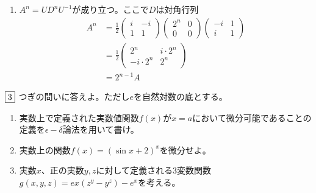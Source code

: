 \documentclass[dvipdfmx]{jsreport}
\begin{document}
\begin{souanswer}
\begin{enumerate}
\begin{equation*}
\end{equation*}
	これをみたすような$U$は$\frac{1}{\sqrt{2}}\begin{pmatrix}i& -i\\1& 1\end{pmatrix}$
	\item $A^n= UD^nU^{-1}$が成り立つ。ここで$D$は対角行列
\begin{align*}
	A^n
	&= \frac{1}{2}\begin{pmatrix}i& -i\\ 1& 1\end{pmatrix}\begin{pmatrix}2^n& 0\\ 0& 0\end{pmatrix}\begin{pmatrix}-i& 1\\ i& 1\end{pmatrix}\\
	&= \frac{1}{2}\begin{pmatrix}2^n& i\cdot 2^n\\ -i\cdot 2^n& 2^n\end{pmatrix}\\
	&= 2^{n- 1}A
\end{align*}
\end{enumerate}
\end{souanswer}

\begin{tcolorbox} %
	$\fbox{3}$ つぎの問いに答えよ。ただし$e$を自然対数の底とする。
\begin{enumerate}
	\item 実数上で定義された実数値関数$f(x)$が$x= a$において微分可能であることの定義を$\epsilon- \delta$論法を用いて書け。
	\item 実数上の関数$f(x)= (\sin{x}+ 2)^x$を微分せよ。
	\item 実数$x$、正の実数$y, z$に対して定義される3変数関数$g(x, y, z)= ex(z^y- y^z)- e^x$を考える。
\end{enumerate}
\end{tcolorbox}
\end{document}
